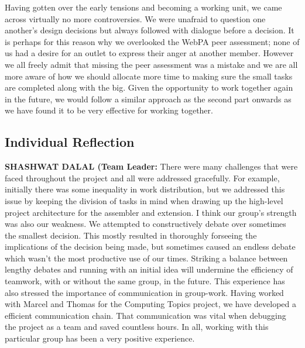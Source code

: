 \documentclass[11pt]{article}
\begin{document}
Having gotten over the early tensions and becoming a working unit, we came across virtually no more controversies. We were unafraid to question one another's design decisions but always followed with dialogue before a decision. It is perhaps for this reason why we overlooked the WebPA peer assessment; none of us had a desire for an outlet to express their anger at another member. However we all freely admit that missing the peer assessment was a mistake and we are all more aware of how we should allocate more time to making sure the small tasks are completed along with the big. Given the opportunity to work together again in the future, we would follow a similar approach as the second part onwards as we have found it to be very effective for working together.\par


\subsection{Individual Reflection}
\setlength{\leftskip}{1.5cm}

\textbf{SHASHWAT DALAL (Team Leader:}​
There were many challenges that were faced throughout the project and all were addressed gracefully. For example, initially there was some inequality in work distribution, but we addressed this issue by keeping the division of tasks in mind when drawing up the high-level project architecture for the assembler and extension. I think our group's strength was also our weakness. We attempted to constructively debate over sometimes the smallest decision. This mostly resulted in thoroughly forseeing the implications of the decision being made, but sometimes caused an endless debate which wasn't the most productive use of our times. Striking a balance between lengthy debates and running with an initial idea will undermine the efficiency of teamwork, with or without the same group, in the future. This experience has also stressed the importance of communication in group-work. Having worked with Marcel and Thomas for the Computing Topics project, we have developed a efficient communication chain. That communication was vital when debugging the project as a team and saved countless hours. In all, working with this particular group has been a very positive experience.\\\par
\end{document}
